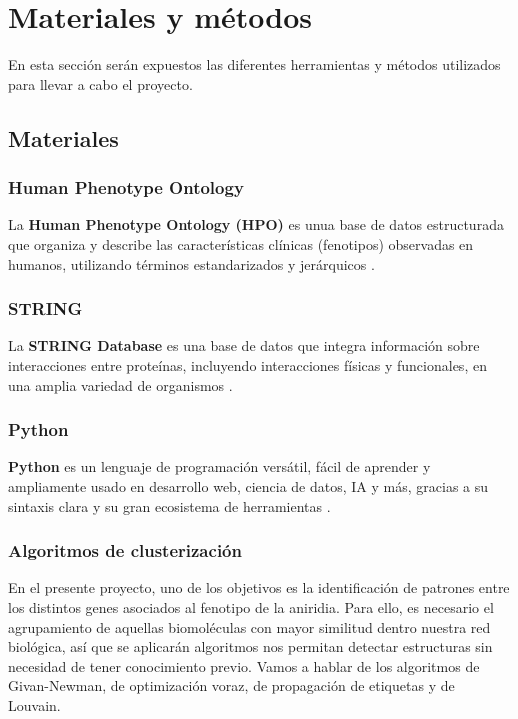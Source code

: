 \section{Materiales y métodos}

En esta sección serán expuestos las diferentes herramientas y métodos utilizados para llevar a cabo el proyecto.

\subsection{\textbf{Materiales}}
\subsubsection{Human Phenotype Ontology}

La \textbf{Human Phenotype Ontology (HPO)} es unua base de datos estructurada que organiza y describe las características clínicas (fenotipos) observadas en humanos, utilizando términos estandarizados y jerárquicos \cite{Gargano2024}.

\subsubsection{STRING}

La \textbf{STRING Database} es una base de datos que integra información sobre interacciones entre proteínas, incluyendo interacciones físicas y funcionales, en una amplia variedad de organismos \cite{STRING2024}.

\subsubsection{Python}

\textbf{Python} es un lenguaje de programación versátil, fácil de aprender y ampliamente usado en desarrollo web, ciencia de datos, IA y más, gracias a su sintaxis clara y su gran ecosistema de herramientas \cite{Python2024}.

\subsubsection{Algoritmos de clusterización}
En el presente proyecto, uno de los objetivos es la identificación de patrones entre los distintos genes asociados al fenotipo de la aniridia. Para ello, es necesario el agrupamiento de aquellas biomoléculas con mayor similitud dentro nuestra red biológica, así que se aplicarán algoritmos nos permitan detectar estructuras sin necesidad de tener conocimiento previo. Vamos a hablar de los algoritmos de Givan-Newman, de optimización voraz, de propagación de etiquetas y de Louvain.

